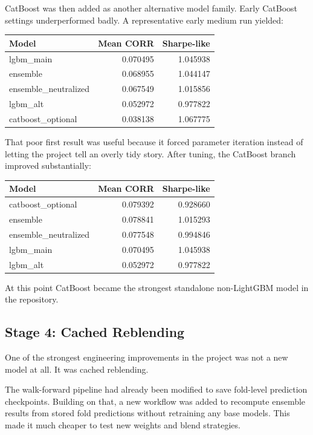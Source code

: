 \documentclass[11pt]{article}
\begin{document}
CatBoost was then added as another alternative model family. Early CatBoost settings underperformed badly. A representative early medium run yielded:

\begin{center}
\begin{tabular}{lrr}
\toprule
Model & Mean CORR & Sharpe-like \\
\midrule
lgbm\_main & 0.070495 & 1.045938 \\
ensemble & 0.068955 & 1.044147 \\
ensemble\_neutralized & 0.067549 & 1.015856 \\
lgbm\_alt & 0.052972 & 0.977822 \\
catboost\_optional & 0.038138 & 1.067775 \\
\bottomrule
\end{tabular}
\end{center}

That poor first result was useful because it forced parameter iteration instead of letting the project tell an overly tidy story. After tuning, the CatBoost branch improved substantially:

\begin{center}
\begin{tabular}{lrr}
\toprule
Model & Mean CORR & Sharpe-like \\
\midrule
catboost\_optional & 0.079392 & 0.928660 \\
ensemble & 0.078841 & 1.015293 \\
ensemble\_neutralized & 0.077548 & 0.994846 \\
lgbm\_main & 0.070495 & 1.045938 \\
lgbm\_alt & 0.052972 & 0.977822 \\
\bottomrule
\end{tabular}
\end{center}

At this point CatBoost became the strongest standalone non-LightGBM model in the repository.

\subsection{Stage 4: Cached Reblending}

One of the strongest engineering improvements in the project was not a new model at all. It was cached reblending.

The walk-forward pipeline had already been modified to save fold-level prediction checkpoints. Building on that, a new workflow was added to recompute ensemble results from stored fold predictions without retraining any base models. This made it much cheaper to test new weights and blend strategies.
\end{document}
